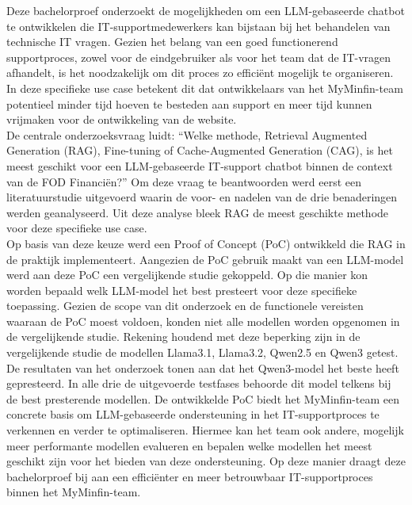 Deze bachelorproef onderzoekt de mogelijkheden om een LLM-gebaseerde chatbot te ontwikkelen die IT-supportmedewerkers kan bijstaan bij het behandelen van technische IT vragen. Gezien het belang van een goed functionerend supportproces, zowel voor de eindgebruiker als voor het team dat de IT-vragen afhandelt, is het noodzakelijk om dit proces zo efficiënt mogelijk te organiseren. In deze specifieke use case betekent dit dat ontwikkelaars van het MyMinfin-team potentieel minder tijd hoeven te besteden aan support en meer tijd kunnen vrijmaken voor de ontwikkeling van de website.
\\[1em]
De centrale onderzoeksvraag luidt: “Welke methode, Retrieval Augmented Generation (RAG), Fine-tuning of Cache-Augmented Generation (CAG), is het meest geschikt voor een LLM-gebaseerde IT-support chatbot binnen de context van de FOD Financiën?” Om deze vraag te beantwoorden werd eerst een literatuurstudie uitgevoerd waarin de voor- en nadelen van de drie benaderingen werden geanalyseerd. Uit deze analyse bleek RAG de meest geschikte methode voor deze specifieke use case.
\\[1em]
Op basis van deze keuze werd een Proof of Concept (PoC) ontwikkeld die RAG in de praktijk implementeert. Aangezien de PoC gebruik maakt van een LLM-model werd aan deze PoC een vergelijkende studie gekoppeld. Op die manier kon worden bepaald welk LLM-model het best presteert voor deze specifieke toepassing. Gezien de scope van dit onderzoek en de functionele vereisten waaraan de PoC moest voldoen, konden niet alle modellen worden opgenomen in de vergelijkende studie. Rekening houdend met deze beperking zijn in de vergelijkende studie de modellen Llama3.1, Llama3.2, Qwen2.5 en Qwen3 getest.
\\[1em]
De resultaten van het onderzoek tonen aan dat het Qwen3-model het beste heeft gepresteerd. In alle drie de uitgevoerde testfases behoorde dit model telkens bij de best presterende modellen. De ontwikkelde PoC biedt het MyMinfin-team een concrete basis om LLM-gebaseerde ondersteuning in het IT-supportproces te verkennen en verder te optimaliseren. Hiermee kan het team ook andere, mogelijk meer performante modellen evalueren en bepalen welke modellen het meest geschikt zijn voor het bieden van deze ondersteuning. Op deze manier draagt deze bachelorproef bij aan een efficiënter en meer betrouwbaar IT-supportproces binnen het MyMinfin-team.
